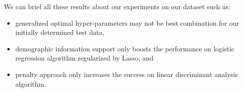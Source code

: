 We can brief all these results about our experiments on our dataset such as:
\begin{itemize}
	\item generalized optimal hyper-parameters may not be best combination for our initially determined test data,
	\item demographic information support only boosts the performance on logistic regression algorithm regularized by Lasso, and
	\item penalty approach only increases the success on linear discriminant analysis algorithm.
\end{itemize}